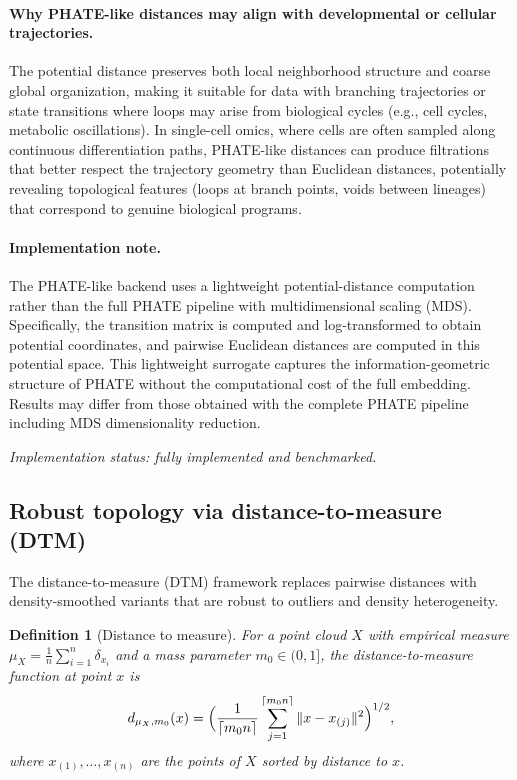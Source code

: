 \documentclass[11pt]{article}
\newtheorem{definition}[theorem]{Definition}
\begin{document}
\paragraph{Why PHATE-like distances may align with developmental or cellular trajectories.}
The potential distance preserves both local neighborhood structure and coarse global organization, making it suitable for data with branching trajectories or state transitions where loops may arise from biological cycles (e.g., cell cycles, metabolic oscillations).
In single-cell omics, where cells are often sampled along continuous differentiation paths, PHATE-like distances can produce filtrations that better respect the trajectory geometry than Euclidean distances, potentially revealing topological features (loops at branch points, voids between lineages) that correspond to genuine biological programs.

\paragraph{Implementation note.}
The PHATE-like backend uses a lightweight potential-distance computation rather than the full PHATE pipeline with multidimensional scaling (MDS).
Specifically, the transition matrix is computed and log-transformed to obtain potential coordinates, and pairwise Euclidean distances are computed in this potential space.
This lightweight surrogate captures the information-geometric structure of PHATE without the computational cost of the full embedding.
Results may differ from those obtained with the complete PHATE pipeline including MDS dimensionality reduction.

\emph{Implementation status: fully implemented and benchmarked.}

\subsection{Robust topology via distance-to-measure (DTM)}
\label{sec:dtm}

The distance-to-measure (DTM) framework \cite{chazal2011dtm, chazal2017robust} replaces pairwise distances with density-smoothed variants that are robust to outliers and density heterogeneity.

\begin{definition}[Distance to measure]\label{def:dtm}
For a point cloud $X$ with empirical measure $\mu_X = \frac{1}{n}\sum_{i=1}^n \delta_{x_i}$ and a mass parameter $m_0 \in (0,1]$, the \emph{distance-to-measure function} at point $x$ is
\[
d_{\mu_X, m_0}(x) = \Bigl( \frac{1}{\lceil m_0 n \rceil} \sum_{j=1}^{\lceil m_0 n \rceil} \|x - x_{(j)}\|^2 \Bigr)^{1/2},
\]
where $x_{(1)}, \ldots, x_{(n)}$ are the points of $X$ sorted by distance to $x$.
\end{definition}
\end{document}
